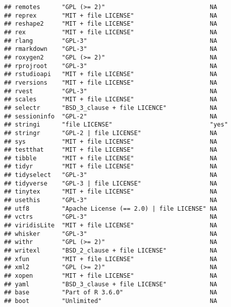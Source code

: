 \documentclass[]{book}
\begin{document}
\begin{verbatim}
## remotes      "GPL (>= 2)"                             NA             
## reprex       "MIT + file LICENSE"                     NA             
## reshape2     "MIT + file LICENSE"                     NA             
## rex          "MIT + file LICENSE"                     NA             
## rlang        "GPL-3"                                  NA             
## rmarkdown    "GPL-3"                                  NA             
## roxygen2     "GPL (>= 2)"                             NA             
## rprojroot    "GPL-3"                                  NA             
## rstudioapi   "MIT + file LICENSE"                     NA             
## rversions    "MIT + file LICENSE"                     NA             
## rvest        "GPL-3"                                  NA             
## scales       "MIT + file LICENSE"                     NA             
## selectr      "BSD_3_clause + file LICENCE"            NA             
## sessioninfo  "GPL-2"                                  NA             
## stringi      "file LICENSE"                           "yes"          
## stringr      "GPL-2 | file LICENSE"                   NA             
## sys          "MIT + file LICENSE"                     NA             
## testthat     "MIT + file LICENSE"                     NA             
## tibble       "MIT + file LICENSE"                     NA             
## tidyr        "MIT + file LICENSE"                     NA             
## tidyselect   "GPL-3"                                  NA             
## tidyverse    "GPL-3 | file LICENSE"                   NA             
## tinytex      "MIT + file LICENSE"                     NA             
## usethis      "GPL-3"                                  NA             
## utf8         "Apache License (== 2.0) | file LICENSE" NA             
## vctrs        "GPL-3"                                  NA             
## viridisLite  "MIT + file LICENSE"                     NA             
## whisker      "GPL-3"                                  NA             
## withr        "GPL (>= 2)"                             NA             
## writexl      "BSD_2_clause + file LICENSE"            NA             
## xfun         "MIT + file LICENSE"                     NA             
## xml2         "GPL (>= 2)"                             NA             
## xopen        "MIT + file LICENSE"                     NA             
## yaml         "BSD_3_clause + file LICENSE"            NA             
## base         "Part of R 3.6.0"                        NA             
## boot         "Unlimited"                              NA             

\end{verbatim}
\end{document}
